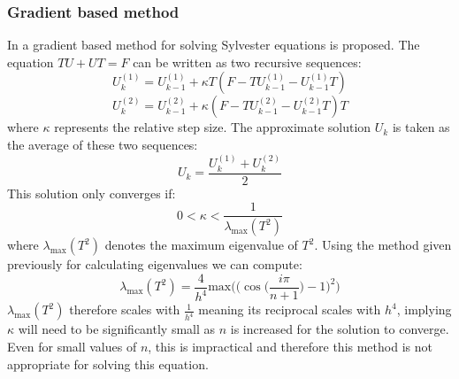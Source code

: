 \documentclass{article}
\numberwithin{equation}{section}
\begin{document}
\subsubsection{Gradient based method}
In \cite{Zhou} a gradient based method for solving Sylvester equations is proposed. The equation $TU + UT = F$ can be written as two recursive sequences:
	\begin{equation}
	U_k^{(1)} = U_{k-1}^{(1)} + \kappa T(F-TU_{k-1}^{(1)} - U_{k-1}^{(1)}T)
	\end{equation}
	\begin{equation}
	U_k^{(2)} = U_{k-1}^{(2)} + \kappa (F-TU_{k-1}^{(2)} - U_{k-1}^{(2)}T)T
	\end{equation}
where $\kappa$ represents the relative step size. The approximate solution $U_k$ is taken as the average of these two sequences:
	\begin{equation}
	U_k = \frac{U_k^{(1)} + U_k^{(2)}}{2}
	\end{equation}
This solution only converges if:
	\begin{equation}
	0 < \kappa < \frac{1}{\lambda_{\text{max}}(T^2)} 
	\end{equation}
where $\lambda_{\text{max}}(T^2)$ denotes the maximum eigenvalue of $T^2$. Using the method given previously for calculating eigenvalues we can compute:
\begin{equation}
\lambda_{\text{max}}(T^2) = \frac{4}{h^4} \text{max} \Big( \big( \cos{\Big(\frac{i \pi}{n+1} \Big) } -1 \big)^2 \Big)
\end{equation}
$\lambda_{\text{max}}(T^2)$ therefore scales with $\frac{1}{h^4}$ meaning its reciprocal scales with $h^4$, implying $\kappa$ will need to be significantly small as $n$ is increased for the solution to converge. Even for small values of $n$, this is impractical and therefore this method is not appropriate for solving this equation.

\newpage



\end{document}
